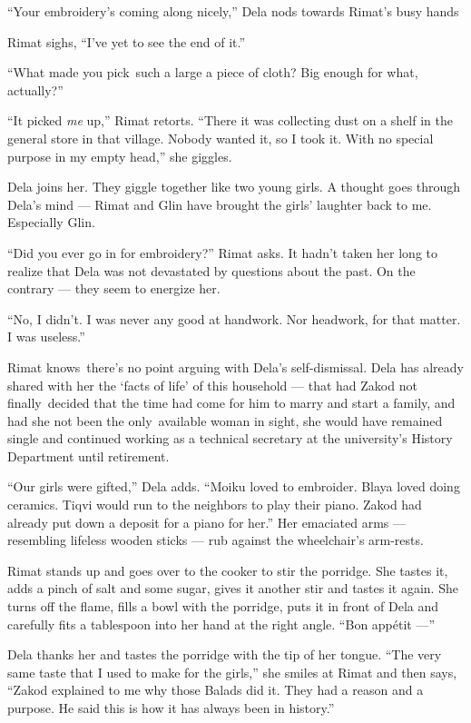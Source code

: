 \documentclass[twoside,11pt]{book}
\begin{document}
``Your embroidery's coming along nicely,'' Dela nods towards Rimat's busy hands

Rimat sighs, ``I've yet to see the end of it.''

``What made you pick~such a large a piece of cloth?  Big enough for what, actually?''

``It picked \textit{me} up,'' Rimat retorts. ``There it was collecting dust on a
shelf in the general store in that village. Nobody wanted it, so I took it. With no special purpose in my empty
head,'' she giggles.

Dela joins her. They giggle together like two young girls. A thought goes through Dela's mind ---  Rimat and Glin have
brought the girls{'} laughter back to me. Especially Glin.

``Did you ever go in for embroidery?'' Rimat asks. It hadn't taken her long to realize that
Dela was not devastated by questions about the past. On the contrary --- they seem to energize her.

``No, I didn't. I was never any good at handwork. Nor headwork, for that matter. I was
useless.''

Rimat knows~there's no point arguing with Dela's self-dismissal. Dela has already shared with her the `facts of life' of
this household ---  that had Zakod not finally~decided that the time had come for him to marry and start a family, and
had she not been the only~available woman in sight, she would have remained single and continued working as a technical
secretary at the university's History Department until retirement.

``Our girls were gifted,'' Dela adds. ``Moiku loved to embroider. Blaya loved
doing ceramics. Tiqvi would run to the neighbors to play their piano. Zakod had already put down a deposit for a piano
for her.''  Her emaciated arms --- resembling lifeless wooden sticks --- rub against the wheelchair's
arm-rests.

Rimat stands up and goes over to the cooker to stir the porridge. She tastes it, adds a pinch of salt and some sugar,
gives it another stir and tastes it again. She turns off the flame, fills a bowl with the porridge, puts it in front of
Dela and carefully fits a tablespoon into her hand at the right angle. ``Bon app\'etit ---''


Dela thanks her and tastes the porridge with the tip of her tongue. ``The very same taste that I used to
make for the girls,'' she smiles at Rimat and then says, ``Zakod explained to me why those
Balads did it. They had a reason and a purpose. He said this is how it has always been in history.''
\end{document}
